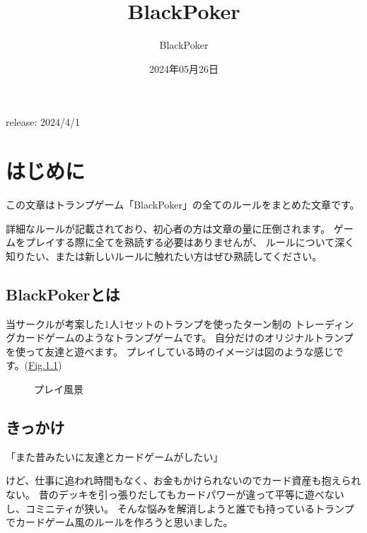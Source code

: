 \documentclass[letterpaper,10pt,dvipdfmx]{sphinxmanual}
\title{BlackPoker}
\date{2024年05月26日}
\author{BlackPoker}
\begin{document}
\pagestyle{empty}
\sphinxmaketitle
\pagestyle{plain}
\sphinxtableofcontents
\pagestyle{normal}
\label{\detokenize{index::doc}}


\sphinxAtStartPar
release: 2024/4/1

\sphinxstepscope


\chapter{はじめに}
\label{\detokenize{init/init:init-rst}}\label{\detokenize{init/init:id1}}\label{\detokenize{init/init::doc}}
\sphinxAtStartPar
この文章はトランプゲーム「BlackPoker」の全てのルールをまとめた文章です。

\sphinxAtStartPar
詳細なルールが記載されており、初心者の方は文章の量に圧倒されます。
ゲームをプレイする際に全てを熟読する必要はありませんが、
ルールについて深く知りたい、または新しいルールに触れたい方はぜひ熟読してください。


\section{BlackPokerとは}
\label{\detokenize{init/init:blackpoker}}
\sphinxAtStartPar
当サークルが考案した1人1セットのトランプを使ったターン制の
トレーディングカードゲームのようなトランプゲームです。
自分だけのオリジナルトランプを使って友達と遊べます。
プレイしている時のイメージは図のような感じです。(\hyperref[\detokenize{init/init:play-image}]{Fig.\@ \ref{\detokenize{init/init:play-image}}})

\begin{figure}[htbp]
\centering
\capstart

\noindent{}
\caption{プレイ風景}\label{\detokenize{init/init:id8}}\label{\detokenize{init/init:play-image}}\end{figure}


\section{きっかけ}
\label{\detokenize{init/init:id2}}
\begin{sphinxVerbatim}[commandchars=\\\{\}]
「また昔みたいに友達とカードゲームがしたい」
\end{sphinxVerbatim}

\sphinxAtStartPar
けど、仕事に追われ時間もなく、お金もかけられないのでカード資産も抱えられない。
昔のデッキを引っ張りだしてもカードパワーが違って平等に遊べないし、コミニティが狭い。
そんな悩みを解消しようと誰でも持っているトランプでカードゲーム風のルールを作ろうと思いました。
\end{document}
